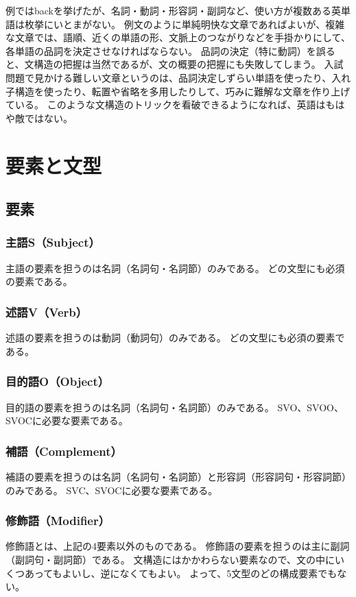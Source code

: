 \documentclass[11pt,a4paper,titlepage]{jsarticle}
\begin{document}
例ではbackを挙げたが、名詞・動詞・形容詞・副詞など、使い方が複数ある英単語は枚挙にいとまがない。
例文のように単純明快な文章であればよいが、複雑な文章では、語順、近くの単語の形、文脈上のつながりなどを手掛かりにして、各単語の品詞を決定させなければならない。
品詞の決定（特に動詞）を誤ると、文構造の把握は当然であるが、文の概要の把握にも失敗してしまう。
入試問題で見かける難しい文章というのは、品詞決定しずらい単語を使ったり、入れ子構造を使ったり、転置や省略を多用したりして、巧みに難解な文章を作り上げている。
このような文構造のトリックを看破できるようになれば、英語はもはや敵ではない。

\section{要素と文型}

\subsection{要素}

\subsubsection{主語S（Subject）}
主語の要素を担うのは名詞（名詞句・名詞節）のみである。
どの文型にも必須の要素である。

\subsubsection{述語V（Verb）}
述語の要素を担うのは動詞（動詞句）のみである。
どの文型にも必須の要素である。

\subsubsection{目的語O（Object）}
目的語の要素を担うのは名詞（名詞句・名詞節）のみである。
SVO、SVOO、SVOCに必要な要素である。

\subsubsection{補語（Complement）}
補語の要素を担うのは名詞（名詞句・名詞節）と形容詞（形容詞句・形容詞節）のみである。
SVC、SVOCに必要な要素である。

\subsubsection{修飾語（Modifier）}
修飾語とは、上記の4要素以外のものである。
修飾語の要素を担うのは主に副詞（副詞句・副詞節）である。
文構造にはかかわらない要素なので、文の中にいくつあってもよいし、逆になくてもよい。
よって、5文型のどの構成要素でもない。
\end{document}
